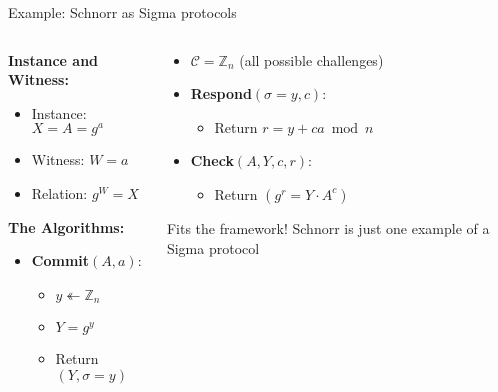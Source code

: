 \documentclass[aspectratio=169, lualatex, handout]{beamer}
\begin{document}
\begin{frame}{Example: Schnorr as Sigma protocols}
	\begin{columns}[c]
		\begin{column}{0.5\textwidth}
			\textbf{Instance and Witness:}
			\begin{itemize}
				\item Instance: $X = A = g^a$
				\item Witness: $W = a$
				\item Relation: $g^W = X$
			\end{itemize}
			\textbf{The Algorithms:}
			\begin{itemize}
				\item \textbf{Commit}$(A, a)$:
				      \begin{itemize}
					      \item $y \twoheadleftarrow \mathbb{Z}_n$
					      \item $Y = g^y$
					      \item Return $(Y, \sigma = y)$
				      \end{itemize}
			\end{itemize}
		\end{column}
		\begin{column}{0.5\textwidth}
			\begin{itemize}
				\item $\mathcal{C} = \mathbb{Z}_n$ (all possible challenges)
				\item \textbf{Respond}$(\sigma = y, c)$:
				      \begin{itemize}
					      \item Return $r = y + ca \bmod n$
				      \end{itemize}
				\item \textbf{Check}$(A, Y, c, r)$:
				      \begin{itemize}
					      \item Return $(g^r = Y \cdot A^c)$
				      \end{itemize}
			\end{itemize}
			\begin{exampleblock}{Fits the framework!}
				Schnorr is just one example of a Sigma protocol
			\end{exampleblock}
		\end{column}
	\end{columns}
\end{frame}
\end{document}
